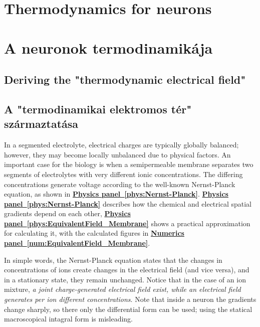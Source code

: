 
\ifx\magyar\undefined
\chapter{Thermodynamics for neurons\label{ch:Thermodynamics}}
\else
\chapter[A neuronok termodinamikája]{A neuronok termodinamikája\label{ch:Thermodynamics}}
\fi
\iflatexml
\else
\minitoc
\fi



\ifx\magyar\undefined
\section[Thermodynamic field]{Deriving the "thermodynamic electrical field"\label{sec:Physics-ThermodynamicField}}
\else
\section[Termodinamikus tér]{A "termodinamikai elektromos tér" szár\-maztatása\label{sec:Physics-ThermodynamicField}}

\fi

\ifx\magyar\undefined
In a segmented electrolyte, electrical charges are typically globally balanced;
however, they may become locally unbalanced due to physical factors.
An important case for the biology is when a semipermeable membrane
separates two segments of electrolytes with very different ionic concentrations. 
The differing concentrations generate voltage according to the 
well-known  Nernst-Planck equation, as shown in
\hyperlink{phys:Nernst-Planck}
{\textbf{Physics panel~\ref{phys:Nernst-Planck}}}.
\hyperlink{phys:Nernst-Planck}
{\textbf{Physics panel~\ref{phys:Nernst-Planck}}}
describes how the chemical and
electrical spatial gradients depend on each other,
\hyperlink{phys:EquivalentField_Membrane}
{\textbf{Physics panel~\ref{phys:EquivalentField_Membrane}}}
shows a practical approximation for calculating it, with 
the calculated figures in 
\hyperlink{num:EquivalentField_Membrane}
{\textbf{Numerics panel~\ref{num:EquivalentField_Membrane}}}.


In simple words, the Nernst-Planck equation states that the changes in
concentrations of ions create changes in the electrical field (and
vice versa), and in a stationary state, they remain unchanged.
Notice that in the case of an ion mixture, \textit{a joint charge-generated electrical field exist, while an electrical field generates
per ion different concentrations}.
Note that inside a neuron the gradients change sharply,
so there only the differential form can be used;
using the statical macroscopical intagral form is misleading.

